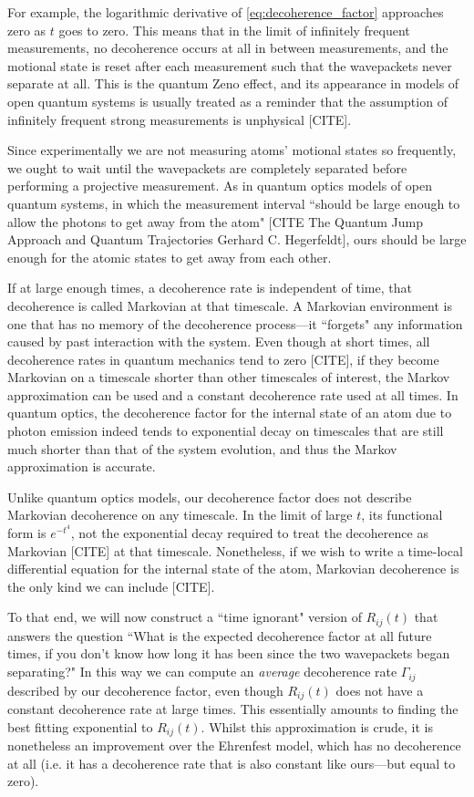 For example, the logarithmic derivative of \eqref{eq:decoherence_factor} approaches zero as $t$ goes to zero. This means that in the limit of infinitely frequent measurements, no decoherence occurs at all in between measurements, and the motional state is reset after each measurement such that the wavepackets never separate at all. This is the quantum Zeno effect, and its appearance in models of open quantum systems is usually treated as a reminder that the assumption of infinitely frequent strong measurements is unphysical [CITE].

Since experimentally we are not measuring atoms' motional states so frequently, we ought to wait until the wavepackets are completely separated before performing a projective measurement. As in quantum optics models of open quantum systems, in which the measurement interval ``should be large enough to allow the photons to get away from the atom" [CITE The Quantum Jump Approach
and Quantum Trajectories Gerhard C. Hegerfeldt], ours should be large enough for the atomic states to get away from each other.

If at large enough times, a decoherence rate is independent of time, that decoherence is called Markovian at that timescale. A Markovian environment is one that has no memory of the decoherence process---it ``forgets" any information caused by past interaction with the system. Even though at short times, all decoherence rates in quantum mechanics tend to zero [CITE], if they become Markovian on a timescale shorter than other timescales of interest, the Markov approximation can be used and a constant decoherence rate used at all times. In quantum optics, the decoherence factor for the internal state of an atom due to photon emission indeed tends to exponential decay on timescales that are still much shorter than that of the system evolution, and thus the Markov approximation is accurate.

Unlike quantum optics models, our decoherence factor does not describe Markovian decoherence on any timescale. In the limit of large $t$, its functional form is $e^{-t^4}$, not the exponential decay required to treat the decoherence as Markovian [CITE] at that timescale. Nonetheless, if we wish to write a time-local differential equation for the internal state of the atom, Markovian decoherence is the only kind we can include [CITE].

To that end, we will now construct a ``time ignorant" version of $R_{ij}(t)$ that answers the question ``What is the expected decoherence factor at all future times, if you don't know how long it has been since the two wavepackets began separating?" In this way we can compute an \emph{average} decoherence rate $\Gamma_{ij}$ described by our decoherence factor, even though $R_{ij}(t)$ does not have a constant decoherence rate at large times. This essentially amounts to finding the best fitting exponential to $R_{ij}(t)$. Whilst this approximation is crude, it is nonetheless an improvement over the Ehrenfest model, which has no decoherence at all (i.e. it has a decoherence rate that is also constant like ours---but equal to zero).

